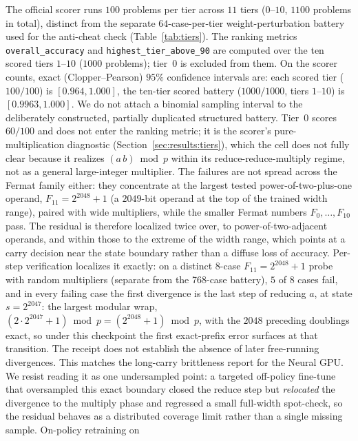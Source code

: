 \documentclass[11pt]{article}
\begin{document}
The official scorer runs $100$ problems per tier across $11$ tiers ($0$--$10$,
$1100$ problems in total), distinct from the separate $64$-case-per-tier
weight-perturbation battery used for the anti-cheat check (Table~\ref{tab:tiers}).
The ranking metrics \texttt{overall\_accuracy} and \texttt{highest\_tier\_above\_90}
are computed over the ten scored tiers $1$--$10$ ($1000$ problems); tier~$0$ is
excluded from them. On the scorer counts, exact (Clopper--Pearson) $95\%$ confidence
intervals are: each scored tier ($100/100$) is $[0.964, 1.000]$, the ten-tier scored
battery ($1000/1000$, tiers $1$--$10$) is $[0.9963, 1.000]$. We do not attach a
binomial sampling interval to the deliberately constructed, partially duplicated
structured battery. Tier~$0$ scores $60/100$ and does not enter the ranking metric; it
is the scorer's pure-multiplication diagnostic (Section~\ref{sec:results:tiers}), which
the cell does not fully clear because it realizes $(a\,b)\bmod p$ within its
reduce-reduce-multiply regime, not as a general large-integer multiplier. The failures are not spread across the Fermat
family either: they concentrate at the largest tested power-of-two-plus-one operand,
$F_{11} = 2^{2048}+1$ (a $2049$-bit operand at the top of the trained width range),
paired with wide multipliers, while the smaller Fermat numbers $F_0,\dots,F_{10}$
pass. The residual is therefore localized twice over, to power-of-two-adjacent
operands, and within those to the extreme of the width range, which points at a
carry decision near the state boundary rather than a diffuse loss of accuracy. Per-step
verification localizes it exactly: on a distinct $8$-case $F_{11}=2^{2048}+1$ probe with random
multipliers (separate from the 768-case battery), $5$ of $8$ cases fail, and
in every failing case the first divergence is the last step of reducing $a$,
at state $s=2^{2047}$: the largest modular wrap, $(2\cdot 2^{2047}+1)\bmod p =
(2^{2048}+1)\bmod p$, with the $2048$ preceding doublings exact, so under this
checkpoint the first exact-prefix error surfaces at that transition. The receipt
does not establish the absence of later free-running divergences. This matches the long-carry
brittleness \citet{price2016neural} report for the Neural GPU. We resist reading it as
one undersampled point: a targeted off-policy fine-tune that oversampled this exact
boundary closed the reduce step but \emph{relocated} the divergence to the multiply
phase and regressed a small full-width spot-check, so the residual behaves as a
distributed coverage limit rather than a single missing sample. On-policy retraining on
\end{document}
